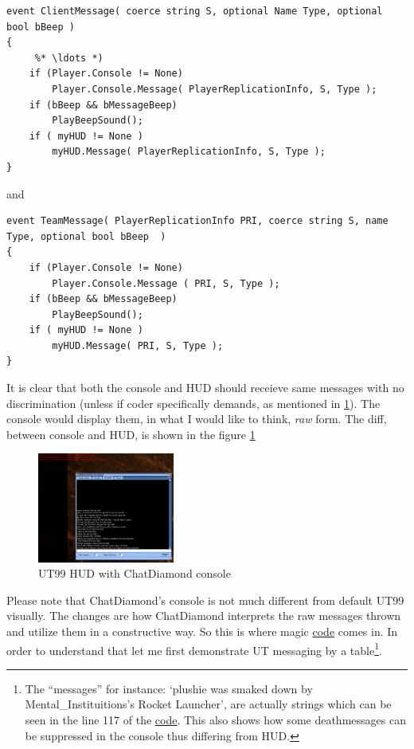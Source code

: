 \documentclass{article}
\begin{document}
\begin{lstlisting}[frame=single]
event ClientMessage( coerce string S, optional Name Type, optional bool bBeep )
{
     %* \ldots *)    
    if (Player.Console != None)
        Player.Console.Message( PlayerReplicationInfo, S, Type );
    if (bBeep && bMessageBeep)
        PlayBeepSound();
    if ( myHUD != None )
        myHUD.Message( PlayerReplicationInfo, S, Type );
}       
\end{lstlisting}
and
\begin{lstlisting}[frame=single]
event TeamMessage( PlayerReplicationInfo PRI, coerce string S, name Type, optional bool bBeep  )
{
    if (Player.Console != None)
        Player.Console.Message ( PRI, S, Type );
    if (bBeep && bMessageBeep)
        PlayBeepSound();
    if ( myHUD != None )
        myHUD.Message( PRI, S, Type );
}     
\end{lstlisting}

It is clear that both the console and HUD should receieve same messages with no discrimination (unless if coder specifically demands, as mentioned in \ref{foot:hudconsolediff}).  The console would display them, in what I would like to think, \emph{raw} form.  The diff, between console and HUD, is shown in the figure \ref{fig:chatdiamond_console_hud}

\begin{figure}
\centering
\label{fig:chatdiamond_console_hud}
\includegraphics[width=0.4\textwidth]{consoleundhud}
\caption{UT99 HUD with ChatDiamond console}
\end{figure}

Please note that ChatDiamond's console is not much different from default UT99 visually.  The changes are how ChatDiamond interprets the raw messages thrown and utilize them in a constructive way. So this is where magic \href{https://github.com/ravimohan1991/ChatDiamond/blob/859323fbd80266b21c9dab163b067cacfa318463/Classes/CDUTConsole.uc#L52-L71}{code} comes in.  In order to understand that let me first demonstrate UT messaging by a table\footnote{\label{foot:hudconsolediff} The ``messages'' for instance: `plushie was smaked down by Mental\_Instituitions's Rocket Launcher', are actually strings which can be seen in the line 117 of the \href{http://uncodex.ut-files.com/UT/v436/Source_botpack/deathmessageplus.html}{code}.  This also shows how some deathmessages can be suppressed in the console thus differing from HUD.}.
\end{document}
